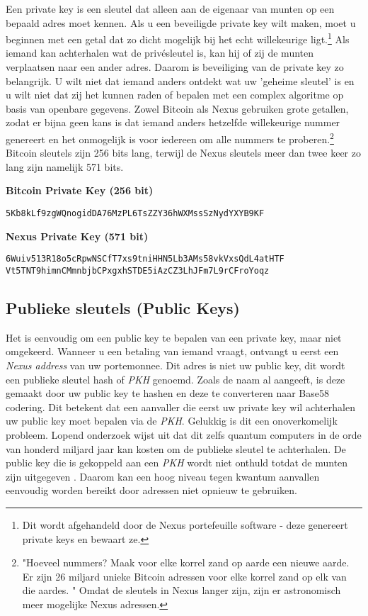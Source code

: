 \documentclass[11pt]{article}
\begin{document}
Een private key is een sleutel dat alleen aan de eigenaar van munten op een bepaald adres moet kennen. 
Als u een beveiligde private key wilt maken, moet u beginnen met een getal dat zo dicht mogelijk bij het echt willekeurige ligt.\footnote{Dit wordt afgehandeld door de Nexus portefeuille software - deze genereert private keys en bewaart ze.}
Als iemand kan achterhalen wat de privésleutel is, kan hij of zij de munten verplaatsen naar een ander adres. Daarom is beveiliging van de private key zo belangrijk. U wilt niet dat iemand anders ontdekt wat uw 'geheime sleutel' is en u wilt niet dat zij het kunnen raden of bepalen met een complex algoritme op basis van openbare gegevens. Zowel Bitcoin als Nexus gebruiken grote getallen, zodat er bijna geen kans is dat iemand anders hetzelfde willekeurige nummer genereert en het onmogelijk is voor iedereen om alle nummers te proberen.\footnote{"Hoeveel nummers? Maak voor elke korrel zand op aarde een nieuwe aarde. Er zijn 26 miljard unieke Bitcoin adressen voor elke korrel zand op elk van die aardes. "\cite{weusesand} Omdat de sleutels in Nexus langer zijn, zijn er astronomisch meer mogelijke Nexus adressen.}
Bitcoin sleutels zijn 256 bits lang, terwijl de Nexus sleutels meer dan twee keer zo lang zijn namelijk 571 bits.

\bigskip
\textbf{Bitcoin Private Key (256 bit)}
\begin{lstlisting}
5Kb8kLf9zgWQnogidDA76MzPL6TsZZY36hWXMssSzNydYXYB9KF
\end{lstlisting}

\bigskip
\textbf{Nexus Private Key (571 bit)}
\begin{lstlisting}
6Wuiv513R18o5cRpwNSCfT7xs9tniHHN5Lb3AMs58vkVxsQdL4atHTF
Vt5TNT9himnCMmnbjbCPxgxhSTDE5iAzCZ3LhJFm7L9rCFroYoqz
\end{lstlisting}

\subsection{Publieke sleutels (Public Keys)}

Het is eenvoudig om een public key te bepalen van een private key, maar niet omgekeerd. Wanneer u een betaling van iemand vraagt, ontvangt u eerst een \textit{Nexus address} van uw portemonnee.
 Dit adres is niet uw public key, dit wordt een publieke sleutel hash of \textit{PKH} genoemd.
Zoals de naam al aangeeft, is deze gemaakt door uw public key te hashen en deze te converteren naar Base58 codering. Dit betekent dat een aanvaller die eerst uw private key wil achterhalen uw public key moet bepalen via de \textit{PKH}.
Gelukkig is dit een onoverkomelijk probleem. Lopend onderzoek wijst uit dat dit zelfs quantum computers in de orde van honderd miljard jaar \cite{registersha3,cryptosha3} kan kosten om de publieke sleutel te achterhalen.
 De public key die is gekoppeld aan een \textit{PKH} wordt niet onthuld totdat de munten zijn uitgegeven \cite{bitcorepkh}.
Daarom kan een hoog niveau tegen kwantum aanvallen eenvoudig worden bereikt door adressen niet opnieuw te gebruiken.\\
\end{document}
